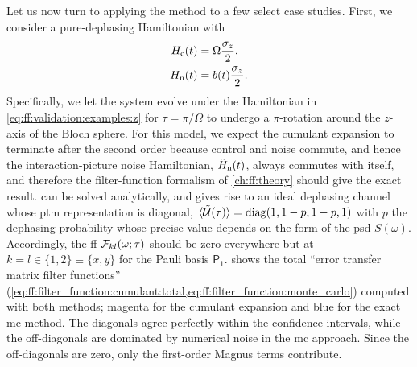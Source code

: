 Let us now turn to applying the method to a few select case studies.
First, we consider a pure-dephasing Hamiltonian with
\begin{equation}\label{eq:ff:validation:examples:z}
    \begin{split}
        H_{\mathrm{c}}(t) &= \Omega\frac{\sigma_z}{2}, \\
        H_{\mathrm{n}}(t) &= b(t)\frac{\sigma_z}{2}.
    \end{split}
\end{equation}
Specifically, we let the system evolve under the Hamiltonian in \cref{eq:ff:validation:examples:z} for $\tau = \pi/\Omega$ to undergo a $\pi$-rotation around the $z$-axis of the Bloch sphere.
For this model, we expect the cumulant expansion to terminate after the second order because control and noise commute, and hence the interaction-picture noise Hamiltonian, $\tilde{H}_{\mathrm{n}}(t)$, always commutes with itself, and therefore the filter-function formalism of \cref{ch:ff:theory} should give the exact result.
 can be solved analytically, and gives rise to an ideal dephasing channel whose \gls{ptm} representation is diagonal, $\liouvUetavg = \diag(1, 1-p, 1-p, 1)$ with $p$ the dephasing probability whose precise value depends on the form of the \gls{psd} $S(\omega)$.
Accordingly, the \gls{ff} $\mathcal{F}_{kl}(\omega;\tau)$ should be zero everywhere but at $k=l\in\{1, 2\}\equiv\{x, y\}$ for the Pauli basis $\mathsf{P}_1$.
 shows the total \enquote{error transfer matrix filter functions} (\cref{eq:ff:filter_function:cumulant:total,eq:ff:filter_function:monte_carlo}) computed with both methods; magenta for the cumulant expansion and blue for the exact \gls{mc} method.
The diagonals agree perfectly within the confidence intervals, while the off-diagonals are dominated by numerical noise in the \gls{mc} approach.
Since the off-diagonals are zero, only the first-order Magnus terms contribute.

